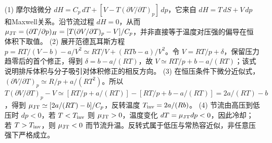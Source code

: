 (1) 摩尔焓微分 \(dH=C_p\,dT+[V-T(\partial V/\partial T)_p]\,dp\)，它来自 \(dH=T\,dS+V\,dp\) 和Maxwell关系。沿节流过程 \(dH=0\)，从而 \(\mu_{\rm JT}=(\partial T/\partial p)_H=[T(\partial V/\partial T)_p-V]/C_p\)，并非直接等于温度对压强的偏导在恒体积下取值。
(2) 展开范德瓦耳斯方程 \(p=RT/(V-b)-a/V^2\simeq RT/V+(RTb-a)/V^2\)。令 \(V=RT/p+\delta\)，保留压力趋零后的首个修正，得到 \(\delta=b-a/(RT)\)，故 \(V\simeq RT/p+b-a/(RT)\)；该式说明排斥体积与分子吸引对体积修正的相反方向。
(3) 在恒压条件下微分近似式，\((\partial V/\partial T)_p\simeq R/p+a/(RT^2)\)。所以 \(T(\partial V/\partial T)_p-V\simeq[RT/p+a/(RT)]-[RT/p+b-a/(RT)]=2a/(RT)-b\)，得到 \(\mu_{\rm JT}\simeq[2a/(RT)-b]/C_p\)，反转温度 \(T_{\rm inv}=2a/(Rb)\)。
(4) 节流由高压到低压时 \(dp<0\)，若 \(T<T_{\rm inv}\) 则 \(\mu_{\rm JT}>0\)，温度变化 \(dT=\mu_{\rm JT}dp<0\)，因此冷却；若 \(T>T_{\rm inv}\)，则 \(\mu_{\rm JT}<0\) 而节流升温。反转式属于低压与常热容近似，非任意压强下严格成立。
